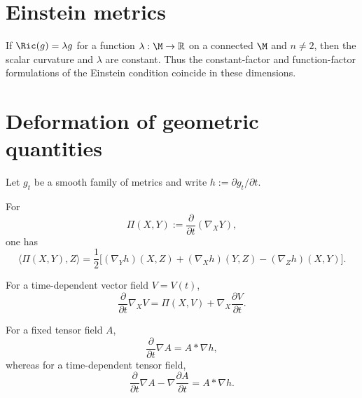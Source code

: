 \section{Einstein metrics}

\begin{proposition}
\label{topping:einstein-metrics-const-scalar}


If $\Ric(g)=\lambda g$ for a function $\lambda:\M\to\mathbb{R}$ on a connected
$\M$ and $n\ne2$, then the scalar curvature and $\lambda$ are constant. Thus the
constant-factor and function-factor formulations of the Einstein condition
coincide in these dimensions.
\end{proposition}

\section{Deformation of geometric quantities}

Let $g_t$ be a smooth family of metrics and write
$h:=\partial g_t/\partial t$.

\begin{proposition}
\label{topping:variation-levi-civita}

For
\[
\Pi(X,Y):=\frac{\partial}{\partial t}(\nabla_XY),
\]
one has
\[
\langle\Pi(X,Y),Z\rangle
=\frac12\bigl[(\nabla_Yh)(X,Z)+(\nabla_Xh)(Y,Z)-(\nabla_Zh)(X,Y)\bigr].
\]
\end{proposition}

\begin{remark}
\label{topping:variation-vector-field}

For a time-dependent vector field $V=V(t)$,
\[
\frac{\partial}{\partial t}\nabla_XV
=\Pi(X,V)+\nabla_X\frac{\partial V}{\partial t}.
\]
\end{remark}

\begin{remark}
\label{topping:variation-covariant-derivative-star}

For a fixed tensor field $A$,
\[
\frac{\partial}{\partial t}\nabla A=A*\nabla h,
\]
whereas for a time-dependent tensor field,
\[
\frac{\partial}{\partial t}\nabla A-\nabla\frac{\partial A}{\partial t}=A*\nabla h.
\]
\end{remark}

